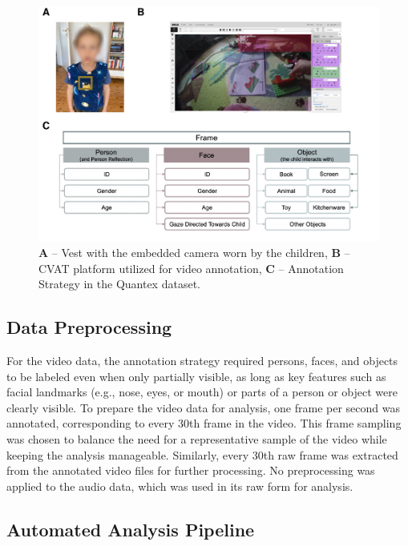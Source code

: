 \documentclass[
  man,floatsintext]{apa6}
\begin{document}
\begin{figure}

{\centering \includegraphics{Quantex_interaction_paper_files/figure-latex/camera-cvat-activity-classes-1} 

}

\caption{\textbf{A} – Vest with the embedded camera worn by the children, \textbf{B} – CVAT platform utilized for video annotation, \textbf{C} – Annotation Strategy in the Quantex dataset.}\label{fig:camera-cvat-activity-classes}
\end{figure}

\subsection{Data Preprocessing}\label{data-preprocessing}

For the video data, the annotation strategy required persons, faces, and objects to be labeled even when only partially visible, as long as key features such as facial landmarks (e.g., nose, eyes, or mouth) or parts of a person or object were clearly visible. To prepare the video data for analysis, one frame per second was annotated, corresponding to every 30th frame in the video. This frame sampling was chosen to balance the need for a representative sample of the video while keeping the analysis manageable. Similarly, every 30th raw frame was extracted from the annotated video files for further processing. No preprocessing was applied to the audio data, which was used in its raw form for analysis.

\subsection{Automated Analysis Pipeline}\label{automated-analysis-pipeline}
\end{document}
